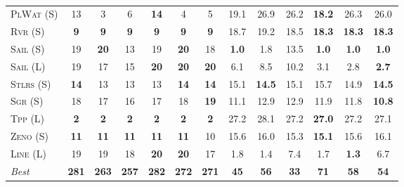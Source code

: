 \documentclass[11pt,landscape]{article}
\begin{document}
\begin{table}[tb]
{\begin{tabular}{|l||cccccc||cccccc||}
\textsc{PlWat} (S)&13&3&6&\textbf{14}&4&5&19.1&26.9&26.2&\textbf{18.2}&26.3&26.0\\
\textsc{Rvr} (S)&\textbf{9}&\textbf{9}&\textbf{9}&\textbf{9}&\textbf{9}&\textbf{9}&18.7&19.2&18.5&\textbf{18.3}&\textbf{18.3}&\textbf{18.3}\\
\textsc{Sail} (S)&19&\textbf{20}&13&19&\textbf{20}&18&\textbf{1.0}&1.8&13.5&\textbf{1.0}&\textbf{1.0}&\textbf{1.0}\\
\textsc{Sail} (L)&19&17&15&\textbf{20}&\textbf{20}&\textbf{20}&6.1&8.5&10.2&3.1&2.8&\textbf{2.7}\\
\textsc{Stlrs} (S)&\textbf{14}&13&13&13&\textbf{14}&\textbf{14}&15.1&\textbf{14.5}&15.1&15.7&14.9&\textbf{14.5}\\
\textsc{Sgr} (S)&18&17&16&17&18&\textbf{19}&11.1&12.9&12.9&11.9&11.8&\textbf{10.8}\\
\textsc{Tpp} (L)&\textbf{2}&\textbf{2}&\textbf{2}&\textbf{2}&\textbf{2}&\textbf{2}&27.2&28.1&27.2&\textbf{27.0}&27.2&27.1\\
\textsc{Zeno} (S)&\textbf{11}&\textbf{11}&\textbf{11}&\textbf{11}&\textbf{11}&10&15.6&16.0&15.3&\textbf{15.1}&15.6&16.1\\
\textsc{Line} (L)&19&19&18&\textbf{20}&\textbf{20}&17&1.8&1.4&7.4&1.7&\textbf{1.3}&6.7
\\\hline
\textit{Best}&\textbf{281}&\textbf{263}&\textbf{257}&\textbf{282}&\textbf{272}&\textbf{271}&\textbf{45}&\textbf{56}&\textbf{33}&\textbf{71}&\textbf{58}&\textbf{54}\\\hline

        \end{tabular}}
        \caption{}
        \label{tab:table-3}
        \end{table}
        
\end{document}
